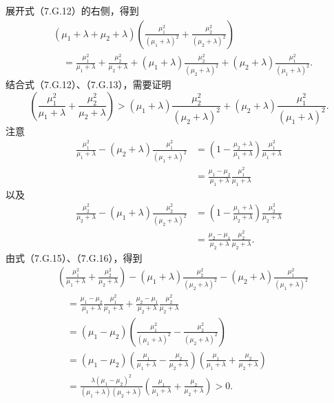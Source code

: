 展开式（7.G.12）的右侧，得到
\begin{equation}
\begin{aligned}
&(\mu_1+\lambda+\mu_2+\lambda)
 \left(\frac{\mu_1^2}{(\mu_1+\lambda)^2}+\frac{\mu_2^2}{(\mu_2+\lambda)^2}\right)\\
&\quad=\frac{\mu_1^2}{\mu_1+\lambda}+\frac{\mu_2^2}{\mu_2+\lambda}
 +(\mu_1+\lambda)\frac{\mu_2^2}{(\mu_2+\lambda)^2}
 +(\mu_2+\lambda)\frac{\mu_1^2}{(\mu_1+\lambda)^2}.
\end{aligned}\tag{7.G.13}
\end{equation}
结合式（7.G.12）、（7.G.13），需要证明
\begin{equation}
\left(\frac{\mu_1^2}{\mu_1+\lambda}+\frac{\mu_2^2}{\mu_2+\lambda}\right)
 >(\mu_1+\lambda)\frac{\mu_2^2}{(\mu_2+\lambda)^2}
 +(\mu_2+\lambda)\frac{\mu_1^2}{(\mu_1+\lambda)^2}.\tag{7.G.14}
\end{equation}
注意
\begin{equation}
\begin{aligned}
\frac{\mu_1^2}{\mu_1+\lambda}-(\mu_2+\lambda)\frac{\mu_1^2}{(\mu_1+\lambda)^2}
 &=\left(1-\frac{\mu_2+\lambda}{\mu_1+\lambda}\right)\frac{\mu_1^2}{\mu_1+\lambda}\\
 &=\frac{\mu_1-\mu_2}{\mu_1+\lambda}\frac{\mu_1^2}{\mu_1+\lambda}
\end{aligned}\tag{7.G.15}
\end{equation}
以及
\begin{equation}
\begin{aligned}
\frac{\mu_2^2}{\mu_2+\lambda}-(\mu_1+\lambda)\frac{\mu_2^2}{(\mu_2+\lambda)^2}
 &=\left(1-\frac{\mu_1+\lambda}{\mu_2+\lambda}\right)\frac{\mu_2^2}{\mu_2+\lambda}\\
 &=\frac{\mu_2-\mu_1}{\mu_2+\lambda}\frac{\mu_2^2}{\mu_2+\lambda}.
\end{aligned}\tag{7.G.16}
\end{equation}
由式（7.G.15）、（7.G.16），得到
\begin{equation}
\begin{aligned}
&\left(\frac{\mu_1^2}{\mu_1+\lambda}+\frac{\mu_2^2}{\mu_2+\lambda}\right)
 -(\mu_1+\lambda)\frac{\mu_2^2}{(\mu_2+\lambda)^2}
 -(\mu_2+\lambda)\frac{\mu_1^2}{(\mu_1+\lambda)^2}\\
&\quad=\frac{\mu_1-\mu_2}{\mu_1+\lambda}\frac{\mu_1^2}{\mu_1+\lambda}
 +\frac{\mu_2-\mu_1}{\mu_2+\lambda}\frac{\mu_2^2}{\mu_2+\lambda}\\
&\quad=(\mu_1-\mu_2)\left(\frac{\mu_1^2}{(\mu_1+\lambda)^2}
 -\frac{\mu_2^2}{(\mu_2+\lambda)^2}\right)\\
&\quad=(\mu_1-\mu_2)\left(\frac{\mu_1}{\mu_1+\lambda}-\frac{\mu_2}{\mu_2+\lambda}\right)
 \left(\frac{\mu_1}{\mu_1+\lambda}+\frac{\mu_2}{\mu_2+\lambda}\right)\\
&\quad=\frac{\lambda(\mu_1-\mu_2)^2}{(\mu_1+\lambda)(\mu_2+\lambda)}
 \left(\frac{\mu_1}{\mu_1+\lambda}+\frac{\mu_2}{\mu_2+\lambda}\right)>0.
\end{aligned}\tag{7.G.17}
\end{equation}
